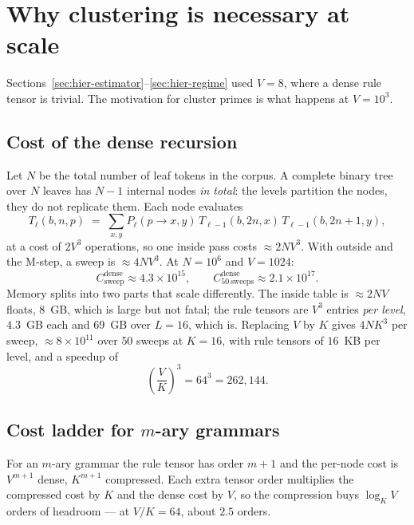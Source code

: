 \section{Why clustering is necessary at scale}
\label{sec:hier-scaling}

Sections~\ref{sec:hier-estimator}--\ref{sec:hier-regime} used $V=8$, where a
dense rule tensor is trivial. The motivation for cluster primes is what happens
at $V=10^3$.

\subsection{Cost of the dense recursion}

Let $N$ be the total number of leaf tokens in the corpus. A complete binary
tree over $N$ leaves has $N-1$ internal nodes \emph{in total}: the levels
partition the nodes, they do not replicate them. Each node evaluates
\begin{equation}
  T_\ell(b,n,p) \;=\; \sum_{x,y} P_\ell(p\to x,y)\,
  T_{\ell-1}(b,2n,x)\, T_{\ell-1}(b,2n{+}1,y),
  \label{eq:inside-cost}
\end{equation}
at a cost of $2V^3$ operations, so one inside pass costs $\approx 2NV^3$. With
outside and the M-step, a sweep is $\approx 4NV^3$. At $N=10^6$ and $V=1024$:
\begin{equation}
  C^{\text{dense}}_{\text{sweep}} \approx 4.3\times 10^{15},
  \qquad
  C^{\text{dense}}_{50\ \text{sweeps}} \approx 2.1\times 10^{17}.
\end{equation}
Memory splits into two parts that scale differently. The inside table is
$\approx 2NV$ floats, $8$~GB, which is large but not fatal; the rule tensors
are $V^3$ entries \emph{per level}, $4.3$~GB each and $69$~GB over $L=16$,
which is. Replacing $V$ by $K$ gives $4NK^3$ per sweep,
$\approx 8\times10^{11}$ over $50$ sweeps at $K=16$, with rule tensors of
$16$~KB per level, and a speedup of
\begin{equation}
  \left(\frac{V}{K}\right)^{3} = 64^3 = 262{,}144.
\end{equation}

\subsection{Cost ladder for $m$-ary grammars}

For an $m$-ary grammar the rule tensor has order $m+1$ and the per-node cost is
$V^{m+1}$ dense, $K^{m+1}$ compressed. Each extra tensor order multiplies the
compressed cost by $K$ and the dense cost by $V$, so the compression buys
$\log_K V$ orders of headroom --- at $V/K = 64$, about $2.5$ orders.

